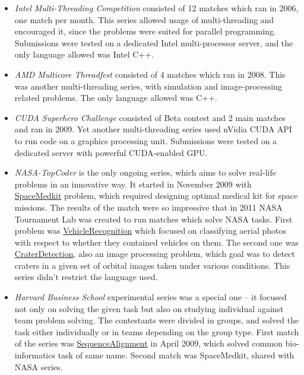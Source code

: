 \documentclass[]{article}
\begin{document}
\begin{itemize}
\item
  \emph{Intel Multi-Threading Competition }consisted of 12 matches which
  ran in 2006, one match per month. This series allowed usage of
  multi-threading and encouraged it, since the problems were suited for
  parallel programming. Submissions were tested on a dedicated Intel
  multi-processor server, and the only language allowed was Intel C++.
\item
  \emph{AMD Multicore Threadfest} consisted of 4 matches which ran in
  2008. This was another multi-threading series, with simulation and
  image-processing related problems. The only language allowed was C++.
\item
  \emph{CUDA Superhero Challenge} consisted of Beta contest and 2 main
  matches and ran in 2009. Yet another multi-threading series used
  nVidia CUDA API to run code on a graphics processing unit. Submissions
  were tested on a dedicated server with powerful CUDA-enabled GPU.
\item
  \emph{NASA-TopCoder} is the only ongoing series, which aims to solve
  real-life problems in an innovative way. It started in November 2009
  with
  \href{http://community.topcoder.com/longcontest/?module=ViewProblemStatement\&rd=14002\&pm=10680}{SpaceMedkit}
  problem, which required designing optimal medical kit for space
  missions. The results of the match were so impressive that in 2011
  NASA Tournament Lab was created to run matches which solve NASA tasks.
  First problem was
  \href{http://community.topcoder.com/longcontest/?module=ViewProblemStatement\&rd=14481\&pm=11313}{VehicleRecognition}
  which focused on classifying aerial photos with respect to whether
  they contained vehicles on them. The second one was
  \href{http://community.topcoder.com/longcontest/?module=ViewProblemStatement\&rd=14570\&pm=11457}{CraterDetection},
  also an image processing problem, which goal was to detect craters in
  a given set of orbital images taken under various conditions. This
  series didn't restrict the language used.
\item
  \emph{Harvard Business School} experimental series was a special one
  -- it focused not only on solving the given task but also on studying
  individual against team problem solving. The contestants were divided
  in groups, and solved the task either individually or in teams
  depending on the group type. First match of the series was
  \href{http://community.topcoder.com/longcontest/?module=ViewProblemStatement\&rd=13796\&pm=10390}{SequenceAlignment}
  in April 2009, which solved common bio-informatics task of same name.
  Second match was SpaceMedkit, shared with NASA series.
\end{itemize}
\end{document}
